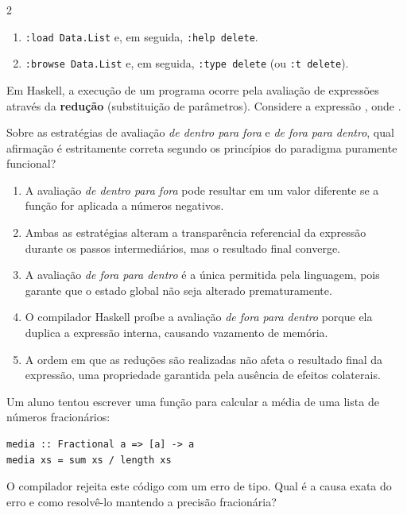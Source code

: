 \documentclass[a4paper,10pt,brazil]{article}
\begin{document}
\begin{multicols}{2}
\begin{enumerate}
  \item \texttt{:load Data.List} e, em seguida, \texttt{:help delete}.

  \item \texttt{:browse Data.List} e, em seguida, \texttt{:type delete} (ou \texttt{:t delete}).


\end{enumerate}

Em Haskell, a execução de um programa ocorre pela avaliação de expressões através da \textbf{redução} (substituição de parâmetros). Considere a expressão , onde . 

Sobre as estratégias de avaliação \emph{de dentro para fora} e \emph{de fora para dentro}, qual afirmação é estritamente correta segundo os princípios do paradigma puramente funcional?

\begin{enumerate}
  \item A avaliação \emph{de dentro para fora} pode resultar em um valor diferente se a função  for aplicada a números negativos.

  \item Ambas as estratégias alteram a transparência referencial da expressão durante os passos intermediários, mas o resultado final converge.

  \item A avaliação \emph{de fora para dentro} é a única permitida pela linguagem, pois garante que o estado global não seja alterado prematuramente.

  \item O compilador Haskell proíbe a avaliação \emph{de fora para dentro} porque ela duplica a expressão interna, causando vazamento de memória.

  \item A ordem em que as reduções são realizadas não afeta o resultado final da expressão, uma propriedade garantida pela ausência de efeitos colaterais.


\end{enumerate}

Um aluno tentou escrever uma função para calcular a média de uma lista de números fracionários:
\begin{verbatim}
media :: Fractional a => [a] -> a
media xs = sum xs / length xs
\end{verbatim}
O compilador rejeita este código com um erro de tipo. Qual é a causa exata do erro e como resolvê-lo mantendo a precisão fracionária?


\end{multicols}
\end{document}
